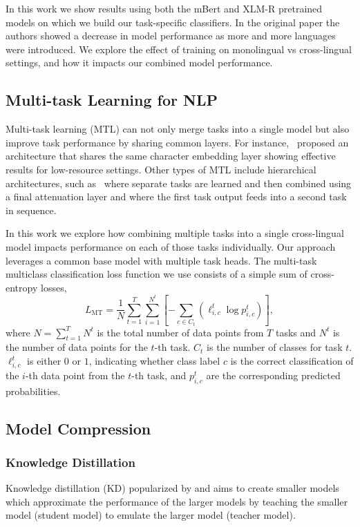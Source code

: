 In this work we show results using both the mBert and XLM-R pretrained models on which we build our task-specific classifiers.
In the original paper \cite{XLMR} the authors showed a decrease in model performance as more and more languages were introduced.
We explore the effect of training on monolingual vs cross-lingual settings, and how it impacts our combined model performance.

\subsection{Multi-task Learning for NLP}
Multi-task learning (MTL) can not only merge tasks into a single model but also improve task performance by sharing common layers.
For instance,~\cite{lin2018multi} proposed an architecture that shares the same character embedding layer showing effective results for low-resource settings.
Other types of MTL include hierarchical architectures, such as~\cite{vijayaraghavan2017twitter} where separate tasks are learned and then combined using a final attenuation layer and \cite{he2019interactive} where the first task output feeds into a second task in sequence.

In this work we explore how combining multiple tasks into a single cross-lingual model impacts performance on each of those tasks individually.
Our approach leverages a common base model with multiple task heads.  
The multi-task multiclass classification loss function we use consists of a simple sum of cross-entropy losses,
\begin{equation}
L_{\mbox{MT}} = \frac{1}{N} \sum_{t=1}^T \sum_{i=1}^{N^t} \left[ -\sum_{c \in C_{t}} \left( \ell_{i,c}^t \log p_{i, c}^t \right) \right],
\end{equation}
where $N = \sum_{t=1}^T {N^t}$ is the total number of data points from $T$ tasks and $N^t$ is the number of data points for the $t$-th task. $C_{t}$ is the number of classes for task $t$. $\ell_{i,c}^t$ is either $0$ or $1$, indicating whether class label $c$ is the correct classification of the $i$-th data point from the $t$-th task, and $ p_{i,c}^t$ are the corresponding predicted probabilities.  

\subsection{Model Compression}
\subsubsection{Knowledge Distillation}
Knowledge distillation (KD) popularized by \cite{hinton2015distilling} and aims to create smaller models which approximate the performance of the larger models by teaching the smaller model (student model) to emulate the larger model (teacher model). 

